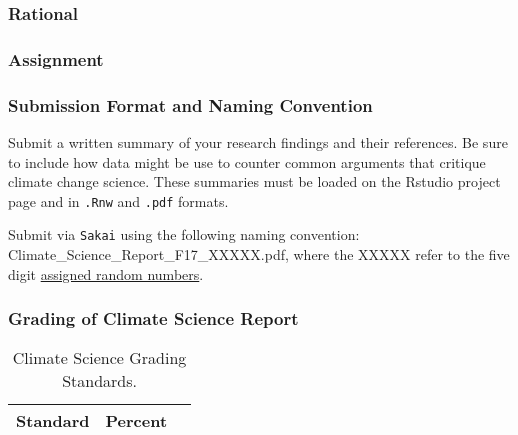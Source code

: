 
\subsubsection{Rational}

\subsubsection{Assignment}

\subsubsection{Submission Format and Naming Convention}

Submit a written summary of your research findings and their references. Be sure to include how data might be use to counter common arguments that critique climate change science. These summaries must be loaded on the Rstudio project page and in \texttt{.Rnw} and \texttt{.pdf} formats. 

Submit via \texttt{Sakai} using the following naming convention: Climate\_Science\_Report\_F17\_XXXXX.pdf, where the XXXXX refer to the five digit \href{https://github.com/marclos/Climate_Change_Narratives/raw/master/Admin/RandomNumbers.pdf}{assigned random numbers}.

\subsubsection{Grading of Climate Science Report}

\begin{table}[h]
\caption{Climate Science Grading Standards.}
\label{tab:climatesciencereportgrading}
\begin{tabular}{lll}\hline
Standard      &   Percent   & \\ \hline\hline
\hline
\end{tabular}
\end{table}

